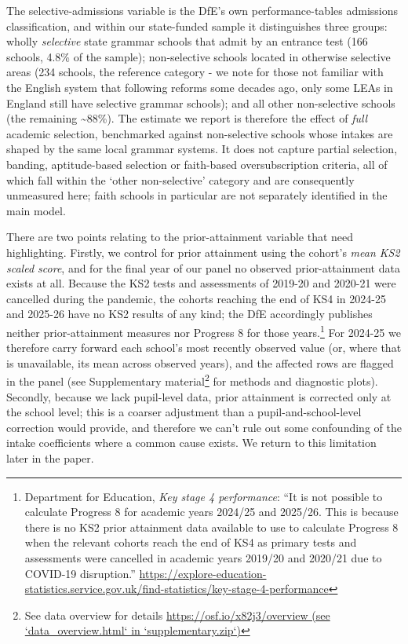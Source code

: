 \documentclass[
  12pt,
  titlepage]{article}
\begin{document}
The selective-admissions variable is the DfE's own performance-tables
admissions classification, and within our state-funded sample it
distinguishes three groups: wholly \emph{selective} state grammar
schools that admit by an entrance test (166 schools, 4.8\% of the
sample); non-selective schools located in otherwise selective areas (234
schools, the reference category - we note for those not familiar with
the English system that following reforms some decades ago, only some
LEAs in England still have selective grammar schools); and all other
non-selective schools (the remaining \textasciitilde88\%). The estimate
we report is therefore the effect of \emph{full} academic selection,
benchmarked against non-selective schools whose intakes are shaped by
the same local grammar systems. It does not capture partial selection,
banding, aptitude-based selection or faith-based oversubscription
criteria, all of which fall within the `other non-selective' category
and are consequently unmeasured here; faith schools in particular are
not separately identified in the main model.

There are two points relating to the prior-attainment variable that need
highlighting. Firstly, we control for prior attainment using the
cohort's \emph{mean KS2 scaled score}, and for the final year of our
panel no observed prior-attainment data exists at all. Because the KS2
tests and assessments of 2019-20 and 2020-21 were cancelled during the
pandemic, the cohorts reaching the end of KS4 in 2024-25 and 2025-26
have no KS2 results of any kind; the DfE accordingly publishes neither
prior-attainment measures nor Progress 8 for those years.\footnote{Department
  for Education, \emph{Key stage 4 performance}: ``It is not possible to
  calculate Progress 8 for academic years 2024/25 and 2025/26. This is
  because there is no KS2 prior attainment data available to use to
  calculate Progress 8 when the relevant cohorts reach the end of KS4 as
  primary tests and assessments were cancelled in academic years 2019/20
  and 2020/21 due to COVID-19 disruption.''
  \url{https://explore-education-statistics.service.gov.uk/find-statistics/key-stage-4-performance}}
For 2024-25 we therefore carry forward each school's most recently
observed value (or, where that is unavailable, its mean across observed
years), and the affected rows are flagged in the panel (see
Supplementary material\footnote{See data overview for details
  \href{https://osf.io/x82j3/overview}{https://osf.io/x82j3/overview
  (see `data\_overview.html` in `supplementary.zip`)}} for methods and
diagnostic plots). Secondly, because we lack pupil-level data, prior
attainment is corrected only at the school level; this is a coarser
adjustment than a pupil-and-school-level correction would provide, and
therefore we can't rule out some confounding of the intake coefficients
where a common cause exists. We return to this limitation later in the
paper.
\end{document}
